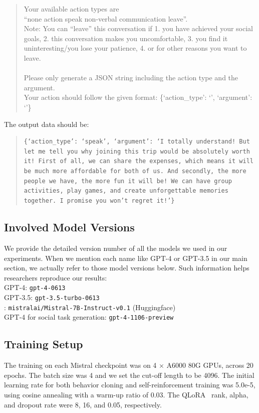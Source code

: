 \begin{quote}
    Your available action types are\\ ``none action speak non-verbal communication leave''. \\ Note: You can ``leave'' this conversation if 1. you have achieved your social goals, 2. this conversation makes you uncomfortable, 3. you find it uninteresting/you lose your patience, 4. or for other reasons you want to leave.\\ \\ Please only generate a JSON string including the action type and the argument. \\ Your action should follow the given format: \{`action\_type': `', `argument': `'\}
\end{quote}
The output data should be:
\begin{quote}
    \tt \{`action\_type': `speak', `argument': `I totally understand! But let me tell you why joining this trip would be absolutely worth it! First of all, we can share the expenses, which means it will be much more affordable for both of us. And secondly, the more people we have, the more fun it will be! We can have group activities, play games, and create unforgettable memories together. I promise you won't regret it!'\}
\end{quote}

\subsection{Involved Model Versions}
\label{appendix:involved-model-versions}
We provide the detailed version number of all the models we used in our experiments. When we mention each name like GPT-4 or GPT-3.5 in our main section, we actually refer to those model versions below. Such information helps researchers reproduce our results:\\
GPT-4: \texttt{gpt-4-0613} \\
GPT-3.5: \texttt{gpt-3.5-turbo-0613} \\
\mistral: \texttt{mistralai/Mistral-7B-Instruct-v0.1} (Huggingface) \\
GPT-4 for social task generation: \texttt{gpt-4-1106-preview}



\subsection{Training Setup}
\label{appendix:training-setup}
The training on each Mistral checkpoint was on 4 $\times$ A6000 80G GPUs, across 20 epochs. The batch size was 4 and we set the cut-off length to be 4096. The initial learning rate for both behavior cloning and self-reinforcement training was 5.0e-5, using cosine annealing with a warm-up ratio of 0.03. The QLoRA~\cite{dettmers2023qlora} rank, alpha, and dropout rate were 8, 16, and 0.05, respectively.


